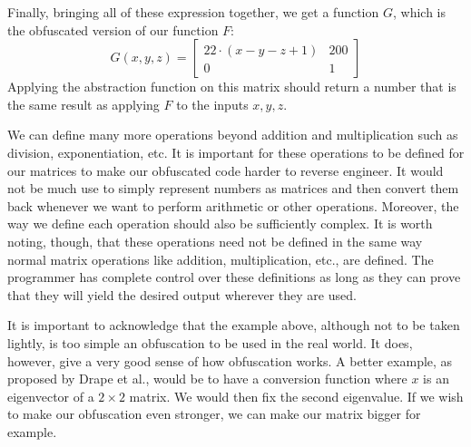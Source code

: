 Finally, bringing all of these expression together, we get a function $ G $,
which is the obfuscated version of our function $ F $:
\begin{equation*}
    G(x, y, z) =
    \begin{bmatrix}
        22 \cdot (x - y -z + 1) & 200 \\
        0 & 1
    \end{bmatrix}
\end{equation*}
Applying the abstraction function on this matrix should return a number that is
the same result as applying $ F $ to the inputs $ x, y, z $.

We can define many more operations beyond addition and multiplication such as
division, exponentiation, etc. It is important for
these operations to be defined for our matrices to make our obfuscated code
harder to reverse engineer. It would not be much use to simply represent
numbers as
matrices and then convert them back whenever we want to perform arithmetic or
other operations. Moreover, the way we define each operation should also be
sufficiently complex. It is worth noting, though, that these operations need
not be defined in the same way normal matrix operations like addition,
multiplication, etc., are defined. The programmer has complete control over
these definitions as long as they can prove that they will yield the desired
output wherever they are used.

It is important to acknowledge that the example above, although not to be taken
lightly, is too simple an
obfuscation to be used in the real world. It does, however, give a very good
sense of how
obfuscation works. A better example, as proposed by Drape et al., would be to
have a conversion function where $ x $ is an eigenvector of a $ 2 \times 2 $
matrix. We would then fix the
second eigenvalue. If we wish to make our obfuscation even stronger, we can
make our matrix bigger for example.



